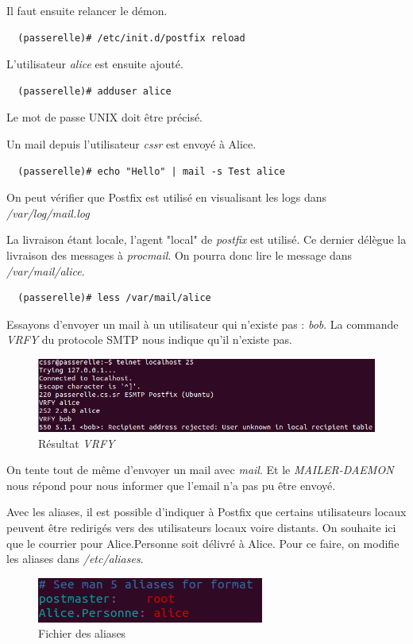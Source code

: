 \documentclass[a4paper]{article}
\begin{document}
Il faut ensuite relancer le démon.
\begin{verbatim}
  (passerelle)# /etc/init.d/postfix reload
\end{verbatim}

L'utilisateur \textit{alice} est ensuite ajouté. 
\begin{verbatim}
  (passerelle)# adduser alice
\end{verbatim}
Le mot de passe UNIX doit être précisé.

Un mail depuis l'utilisateur \textit{cssr} est envoyé à Alice.
\begin{verbatim}
  (passerelle)# echo "Hello" | mail -s Test alice
\end{verbatim}

On peut vérifier que Postfix est utilisé en visualisant les logs
dans \textit{/var/log/mail.log}

La livraison étant locale, l'agent "local" de \textit{postfix}
est utilisé. Ce dernier délègue la livraison des messages
à \textit{procmail}. On pourra donc lire le message dans 
\textit{/var/mail/alice}.
\begin{verbatim}
  (passerelle)# less /var/mail/alice
\end{verbatim}

Essayons d'envoyer un mail à un utilisateur qui n'existe pas : \textit{bob}.
La commande \textit{VRFY} du protocole SMTP nous indique qu'il n'existe pas.
\begin{figure}[!ht]
	\centering
	\includegraphics[scale=.6]{VRFY.PNG}
	\caption{\label{verify} Résultat \textit{VRFY}}
\end{figure}
 
On tente tout de même d'envoyer un mail avec \textit{mail}. Et 
le \textit{MAILER-DAEMON} nous répond pour nous informer que
l'email n'a pas pu être envoyé.

Avec les aliases, il est possible d'indiquer à Postfix que certains
utilisateurs locaux peuvent être redirigés vers des utilisateurs
locaux voire distants.
On souhaite ici que le courrier pour Alice.Personne soit délivré
à Alice. 
Pour ce faire, on modifie les aliases dans \textit{/etc/aliases}.
\begin{figure}[!ht]
	\centering
	\includegraphics[scale=.7]{Aliases.PNG}
	\caption{\label{alias} Fichier des aliases}
\end{figure}
\end{document}
